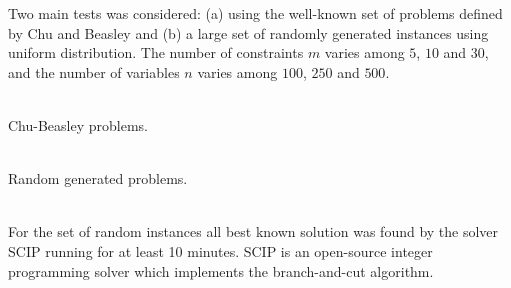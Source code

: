 Two main tests was considered:
(a) using the well-known set of problems defined by Chu and Beasley \cite{Chu-Beasley-1998}
and (b) a large set of randomly generated instances using uniform distribution.
The number of constraints $m$ varies among $5$, $10$ and $30$, and the number
of variables $n$ varies among $100$, $250$ and $500$.
\\[2mm]
\begin{minipage}[c]{0.4\linewidth}
  \begin{center}
    
	\\[2mm]
	Chu-Beasley problems.
  \end{center}
\end{minipage}
\begin{minipage}[c]{0.6\linewidth}
  \begin{center}
    
	\\[2mm]
	Random generated problems.
  \end{center}
\end{minipage}
\\[2mm]
For the set of random instances all best known solution was found by the solver
SCIP running for at least 10 minutes.
SCIP is an open-source integer programming solver which
implements the branch-and-cut algorithm.
